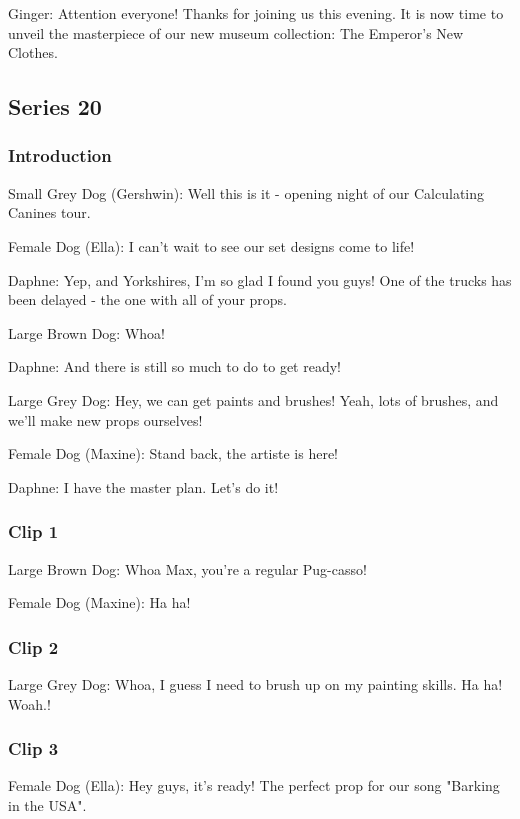 Ginger: Attention everyone! Thanks for joining us this evening. It is now time to unveil the masterpiece of our new museum collection: The Emperor's New Clothes.

\subsection{Series 20}

\subsubsection{Introduction}

Small Grey Dog (Gershwin): Well this is it - opening night of our Calculating Canines tour.

Female Dog (Ella): I can't wait to see our set designs come to life!

Daphne: Yep, and Yorkshires, I'm so glad I found you guys! One of the trucks has been delayed - the one with all of your props.

Large Brown Dog: Whoa!

Daphne: And there is still so much to do to get ready!

Large Grey Dog: Hey, we can get paints and brushes! Yeah, lots of brushes, and we'll make new props ourselves!

Female Dog (Maxine): Stand back, the artiste is here!

Daphne: I have the master plan. Let's do it!

\subsubsection{Clip 1}

Large Brown Dog: Whoa Max, you're a regular Pug-casso!

Female Dog (Maxine): Ha ha!

\subsubsection{Clip 2}

Large Grey Dog: Whoa, I guess I need to brush up on my painting skills. Ha ha! Woah.!

\subsubsection{Clip 3}

Female Dog (Ella): Hey guys, it's ready! The perfect prop for our song "Barking in the USA".

